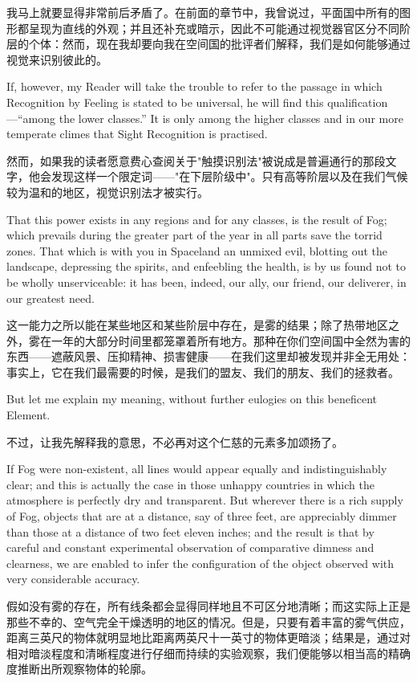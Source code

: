 \documentclass[12pt,UTF8]{ctexbook}
\begin{document}
我马上就要显得非常前后矛盾了。在前面的章节中，我曾说过，平面国中所有的图形都呈现为直线的外观；并且还补充或暗示，因此不可能通过视觉器官区分不同阶层的个体：然而，现在我却要向我在空间国的批评者们解释，我们是如何能够通过视觉来识别彼此的。

If, however, my Reader will take the trouble to refer to the passage in which Recognition by Feeling is stated to be universal, he will find this qualification---``among the lower classes.'' It is only among the higher classes and in our more temperate climes that Sight Recognition is practised.

然而，如果我的读者愿意费心查阅关于"触摸识别法"被说成是普遍通行的那段文字，他会发现这样一个限定词——"在下层阶级中"。只有高等阶层以及在我们气候较为温和的地区，视觉识别法才被实行。

That this power exists in any regions and for any classes, is the result of Fog; which prevails during the greater part of the year in all parts save the torrid zones. That which is with you in Spaceland an unmixed evil, blotting out the landscape, depressing the spirits, and enfeebling the health, is by us found not to be wholly unserviceable: it has been, indeed, our ally, our friend, our deliverer, in our greatest need.

这一能力之所以能在某些地区和某些阶层中存在，是雾的结果；除了热带地区之外，雾在一年的大部分时间里都笼罩着所有地方。那种在你们空间国中全然为害的东西——遮蔽风景、压抑精神、损害健康——在我们这里却被发现并非全无用处：事实上，它在我们最需要的时候，是我们的盟友、我们的朋友、我们的拯救者。

But let me explain my meaning, without further eulogies on this beneficent Element.

不过，让我先解释我的意思，不必再对这个仁慈的元素多加颂扬了。

If Fog were non-existent, all lines would appear equally and indistinguishably clear; and this is actually the case in those unhappy countries in which the atmosphere is perfectly dry and transparent. But wherever there is a rich supply of Fog, objects that are at a distance, say of three feet, are appreciably dimmer than those at a distance of two feet eleven inches; and the result is that by careful and constant experimental observation of comparative dimness and clearness, we are enabled to infer the configuration of the object observed with very considerable accuracy.

假如没有雾的存在，所有线条都会显得同样地且不可区分地清晰；而这实际上正是那些不幸的、空气完全干燥透明的地区的情况。但是，只要有着丰富的雾气供应，距离三英尺的物体就明显地比距离两英尺十一英寸的物体更暗淡；结果是，通过对相对暗淡程度和清晰程度进行仔细而持续的实验观察，我们便能够以相当高的精确度推断出所观察物体的轮廓。
\end{document}
